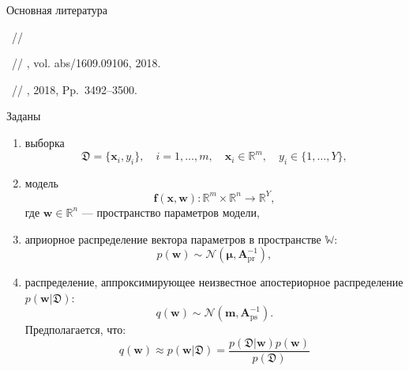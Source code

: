 \documentclass[9pt,pdf,hyperref={unicode}]{beamer}
\begin{document}
	\begin{frame}{Основная литература}
			
			\textsc{}
			
			\textbf{}~//
			
			\textsc{}
			
			\textbf{}~//
			, vol. abs/1609.09106, 2018.
			
			\textsc{}
			
			\textbf{}~//
			, 2018, Pp.\, 3492--3500.
			
		
	\end{frame}

\begin{frame}{Заданы}
\begin{enumerate}
    \item выборка 
    $$\mathfrak{D} = \{ \mathbf{x}_i, y_i\}, \quad i = 1,\dots, m, \quad \mathbf{x}_i \in \mathbb{R}^m, \quad y_i \in \{1,\dots,Y\}, $$
    \item модель
    $$\mathbf{f}(\mathbf{x},\mathbf{w}) : \mathbb{R}^m \times \mathbb{R}^n \longrightarrow \mathbb{R}^Y,$$
     где $\mathbf{w} \in \mathbb{R}^n$ --- пространство параметров модели,
    \item априорное распределение вектора параметров в пространстве $\mathbb{W}$:
    $$p(\mathbf{w}) \sim \mathcal{N} (\boldsymbol{\mu}, \mathbf{A}_{\text{pr}}^{-1}),$$
    \item распределение, аппроксимирующее неизвестное апостериорное распределение $p(\mathbf{w}| \mathfrak{D})$:
    $$q(\mathbf{w}) \sim \mathcal{N} (\mathbf{m},\mathbf{A}_{\text{ps}}^{-1}).$$
    Предполагается, что:
    $$q(\mathbf{w}) \approx p(\mathbf{w}|\mathfrak{D}) = \frac{p(\mathfrak{D} | \mathbf{w}) p(\mathbf{w})}{p(\mathfrak{D})}$$
\end{enumerate}




\end{frame}
\end{document}
